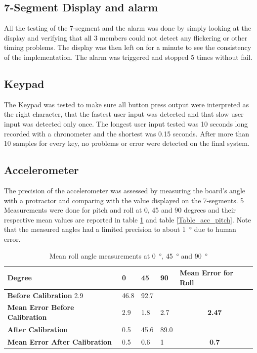 \documentclass[12pt]{article}
\begin{document}
\subsection{7-Segment Display and alarm}
All the testing of the 7-segment and the alarm was done by simply looking at the display and verifying that all 3 members could not detect any flickering or other timing problems. The display was then left on for a minute to see the consistency of the implementation. The alarm was triggered and stopped 5 times without fail.
\subsection{Keypad}
The Keypad was tested to make sure all button press output were interpreted as the right character, that the fastest user input was detected and that slow user input was detected only once. The longest user input tested was 10 seconds long recorded with a chronometer and the shortest was 0.15 seconds. After more than 10 samples for every key, no problems or error were detected on the final system.

\subsection{Accelerometer}
The precision of the accelerometer was assessed by measuring the board's angle with a protractor and comparing with the value displayed on the 7-segments. 5 Measurements were done for pitch and roll at 0, 45 and 90 degrees and their respective mean values are reported in table \ref{Table_acc_roll} and table \ref{Table_acc_pitch}. Note that the measured angles had a limited precision to about \SI{1}{\degree} due to human error.

\begin{table}[!h]
\centering
\caption{Mean roll angle measurements at \SI{0}{\degree}, \SI{45}{\degree} and \SI{90}{\degree}}
\label{Table_acc_roll}
\begin{tabular}{lllll}
\hline
\textbf{Degree} & \textbf{0} & \textbf{45} & \textbf{90} & \textbf{Mean Error for Roll}
\\ \hline
\textbf{Before Calibration} 2.9 & 46.8 & 92.7
\\ \hline
\textbf{Mean Error Before Calibration} & 2.9 & 1.8 & 2.7 & \multicolumn{1}{c}{\textbf{2.47}}
\\ \hline
\textbf{After Calibration} & 0.5 & 45.6 & 89.0
\\ \hline
\textbf{Mean Error After Calibration} & 0.5 & 0.6 & 1 & \multicolumn{1}{c}{\textbf{0.7}}
\\ \hline
\end{tabular}
\end{table}
\end{document}
